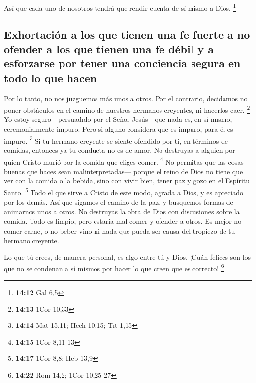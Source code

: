  Así que cada uno de nosotros tendrá que rendir cuenta de
sí mismo a Dios. \footnote{\textbf{14:12} Gal 6,5}

\hypertarget{exhortaciuxf3n-a-los-que-tienen-una-fe-fuerte-a-no-ofender-a-los-que-tienen-una-fe-duxe9bil-y-a-esforzarse-por-tener-una-conciencia-segura-en-todo-lo-que-hacen}{%
\subsection{Exhortación a los que tienen una fe fuerte a no ofender a
los que tienen una fe débil y a esforzarse por tener una conciencia
segura en todo lo que
hacen}\label{exhortaciuxf3n-a-los-que-tienen-una-fe-fuerte-a-no-ofender-a-los-que-tienen-una-fe-duxe9bil-y-a-esforzarse-por-tener-una-conciencia-segura-en-todo-lo-que-hacen}}

 Por lo tanto, no nos juzguemos más unos a otros. Por el
contrario, decidamos no poner obstáculos en el camino de nuestros
hermanos creyentes, ni hacerlos caer. \footnote{\textbf{14:13} 1Cor
  10,33}  Yo estoy seguro---persuadido por el Señor
Jesús---que nada es, en sí mismo, ceremonialmente impuro. Pero si alguno
considera que es impuro, para él es impuro. \footnote{\textbf{14:14} Mat
  15,11; Hech 10,15; Tit 1,15}  Si tu hermano creyente se
siente ofendido por ti, en términos de comidas, entonces ya tu conducta
no es de amor. No destruyas a alguien por quien Cristo murió por la
comida que eliges comer. \footnote{\textbf{14:15} 1Cor 8,11-13}
 No permitas que las cosas buenas que haces sean
malinterpretadas---  porque el reino de Dios no tiene que
ver con la comida o la bebida, sino con vivir bien, tener paz y gozo en
el Espíritu Santo. \footnote{\textbf{14:17} 1Cor 8,8; Heb 13,9}
 Todo el que sirve a Cristo de este modo, agrada a Dios,
y es apreciado por los demás.  Así que sigamos el camino
de la paz, y busquemos formas de animarnos unos a otros. 
No destruyas la obra de Dios con discusiones sobre la comida. Todo es
limpio, pero estaría mal comer y ofender a otros.  Es
mejor no comer carne, o no beber vino ni nada que pueda ser causa del
tropiezo de tu hermano creyente.

 Lo que tú crees, de manera personal, es algo entre tú y
Dios. ¡Cuán felices son los que no se condenan a sí mismos por hacer lo
que creen que es correcto! \footnote{\textbf{14:22} Rom 14,2; 1Cor
  10,25-27}

